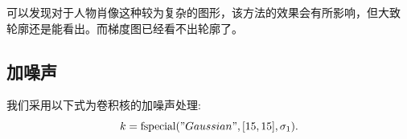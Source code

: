 \documentclass[a4paper,  11pt]{ctexart}
\begin{document}
\begin{figure}[H]
\end{figure}
可以发现对于人物肖像这种较为复杂的图形，该方法的效果会有所影响，但大致
轮廓还是能看出。而梯度图已经看不出轮廓了。
\subsection{加噪声}
我们采用以下式为卷积核的加噪声处理:
\[
k = \text{fspecial}("Gaussian",[15,15],\sigma_1).
\]
\end{document}

